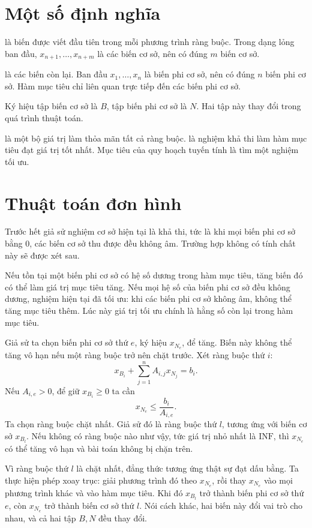 \documentclass[11pt]{article}
\newcommand{\INF}{\mathrm{INF}}
\begin{document}
\section{Một số định nghĩa}

 là biến được viết đầu tiên trong mỗi phương trình ràng
buộc. Trong dạng lỏng ban đầu, \(x_{n+1},\ldots,x_{n+m}\) là các biến cơ sở,
nên có đúng \(m\) biến cơ sở.

 là các biến còn lại. Ban đầu
\(x_1,\ldots,x_n\) là biến phi cơ sở, nên có đúng \(n\) biến phi cơ sở. Hàm
mục tiêu chỉ liên quan trực tiếp đến các biến phi cơ sở.

Ký hiệu tập biến cơ sở là \(B\), tập biến phi cơ sở là \(N\). Hai tập này
thay đổi trong quá trình thuật toán.

 là một bộ giá trị làm thỏa mãn tất cả ràng buộc.
 là nghiệm khả thi làm hàm mục tiêu đạt giá trị tốt
nhất. Mục tiêu của quy hoạch tuyến tính là tìm một nghiệm tối ưu.

\section{Thuật toán đơn hình}

Trước hết giả sử nghiệm cơ sở hiện tại là khả thi, tức là khi mọi biến phi
cơ sở bằng \(0\), các biến cơ sở thu được đều không âm. Trường hợp không có
tính chất này sẽ được xét sau.

Nếu tồn tại một biến phi cơ sở có hệ số dương trong hàm mục tiêu, tăng biến
đó có thể làm giá trị mục tiêu tăng. Nếu mọi hệ số của biến phi cơ sở đều
không dương, nghiệm hiện tại đã tối ưu: khi các biến phi cơ sở không âm,
không thể tăng mục tiêu thêm. Lúc này giá trị tối ưu chính là hằng số còn
lại trong hàm mục tiêu.

Giả sử ta chọn biến phi cơ sở thứ \(e\), ký hiệu \(x_{N_e}\), để tăng.
Biến này không thể tăng vô hạn nếu một ràng buộc trở nên chặt trước. Xét
ràng buộc thứ \(i\):
\[
  x_{B_i}+\sum_{j=1}^{n} A_{i,j}x_{N_j}=b_i.
\]
Nếu \(A_{i,e}>0\), để giữ \(x_{B_i}\ge 0\) ta cần
\[
  x_{N_e}\le \frac{b_i}{A_{i,e}}.
\]
Ta chọn ràng buộc chặt nhất. Giả sử đó là ràng buộc thứ \(l\), tương ứng với
biến cơ sở \(x_{B_l}\). Nếu không có ràng buộc nào như vậy, tức giá trị nhỏ
nhất là \(\INF\), thì \(x_{N_e}\) có thể tăng vô hạn và bài toán không bị
chặn trên.

Vì ràng buộc thứ \(l\) là chặt nhất, đẳng thức tương ứng thật sự đạt dấu
bằng. Ta thực hiện phép xoay trục: giải phương trình đó theo \(x_{N_e}\),
rồi thay \(x_{N_e}\) vào mọi phương trình khác và vào hàm mục tiêu. Khi đó
\(x_{B_l}\) trở thành biến phi cơ sở thứ \(e\), còn \(x_{N_e}\) trở thành
biến cơ sở thứ \(l\). Nói cách khác, hai biến này đổi vai trò cho nhau, và
cả hai tập \(B,N\) đều thay đổi.
\end{document}

